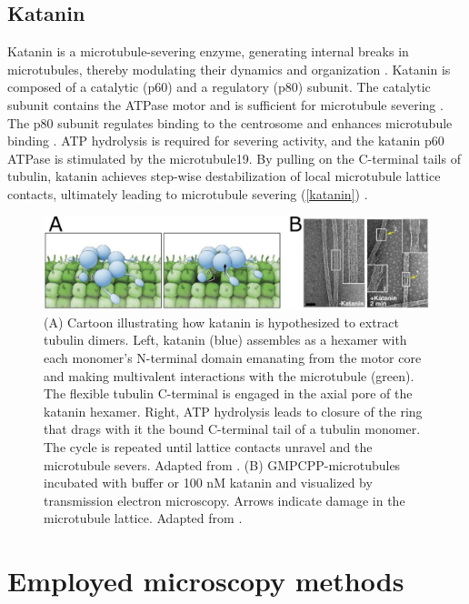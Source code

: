 \subsection{Katanin}
Katanin is a microtubule-severing enzyme, generating internal breaks in microtubules, thereby modulating their dynamics and organization \parencite{ROLLMECAK201096}. Katanin is composed of a catalytic (p60) and a regulatory (p80) subunit. The catalytic subunit contains the ATPase motor and is sufficient for microtubule severing \parencite{McNally2014}. The p80 subunit regulates binding to the centrosome and enhances microtubule binding \parencite{Joly3604}. ATP hydrolysis is required for severing activity, and the katanin p60 ATPase is stimulated by the microtubule19. By pulling on the C-terminal tails of tubulin, katanin achieves step-wise destabilization of local microtubule lattice contacts, ultimately leading to microtubule severing (\autoref{katanin}) \parencite{McNally2014}.
\label{sec:katanin}

\begin{figure}[h!tb]
\centering
\includegraphics[scale=1.1]{Figures/katanin.png}
\caption[Introduction to katanin.]{
(A) Cartoon illustrating how katanin is hypothesized to extract tubulin dimers. Left, katanin (blue) assembles as a hexamer with each monomer's N-terminal domain emanating from the motor core and making multivalent interactions with the microtubule (green). The flexible tubulin C-terminal is engaged in the axial pore of the katanin hexamer. Right, ATP hydrolysis leads to closure of the ring that drags with it the bound C-terminal tail of a tubulin monomer. The cycle is repeated until lattice contacts unravel and the microtubule severs. Adapted from \cite{Zehr2017}. (B) GMPCPP-microtubules incubated with buffer or 100 nM katanin and visualized by transmission electron microscopy. Arrows indicate damage in the microtubule lattice. Adapted from \cite{Grigorieff2018}.
	}\label{katanin}
\end{figure}

\section{Employed microscopy methods}
\label{sec:microscopy}
